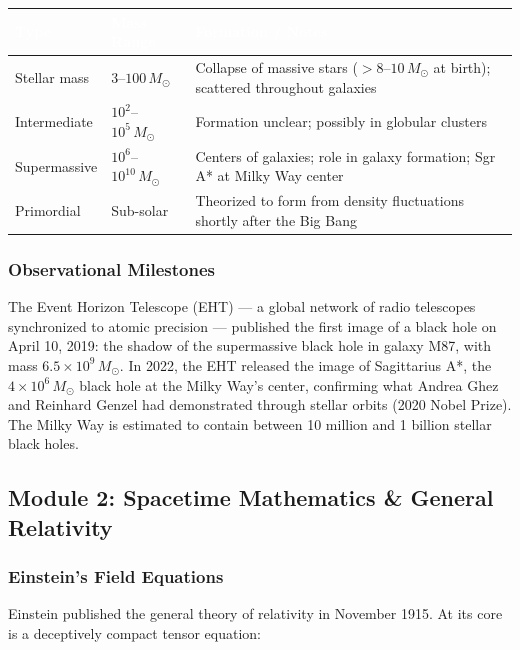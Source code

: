 \documentclass[11pt,letterpaper]{article}
\newcommand{\tableheader}[1]{\textbf{\sffamily\textcolor{white}{#1}}}
\begin{document}
\begin{center}
\begin{tabularx}{\textwidth}{L{3.5cm}L{3.5cm}X}
\toprule
{}
\tableheader{Type} & \tableheader{Mass Range} & \tableheader{Formation / Notes} \\
\midrule
Stellar mass & $3$--$100\, M_\odot$ & Collapse of massive stars ($>8$--$10\, M_\odot$ at birth); scattered throughout galaxies \\
Intermediate & $10^2$--$10^5\, M_\odot$ & Formation unclear; possibly in globular clusters \\
Supermassive & $10^6$--$10^{10}\, M_\odot$ & Centers of galaxies; role in galaxy formation; Sgr A* at Milky Way center \\
Primordial & Sub-solar & Theorized to form from density fluctuations shortly after the Big Bang \\
\bottomrule
\end{tabularx}
\end{center}

\subsubsection{Observational Milestones}

The Event Horizon Telescope (EHT) --- a global network of radio telescopes synchronized to atomic precision --- published the first image of a black hole on April 10, 2019: the shadow of the supermassive black hole in galaxy M87, with mass $6.5 \times 10^9\, M_\odot$. In 2022, the EHT released the image of Sagittarius A*, the $4 \times 10^6\, M_\odot$ black hole at the Milky Way's center, confirming what Andrea Ghez and Reinhard Genzel had demonstrated through stellar orbits (2020 Nobel Prize). The Milky Way is estimated to contain between 10 million and 1 billion stellar black holes.

\subsection{Module 2: Spacetime Mathematics \& General Relativity}

\subsubsection{Einstein's Field Equations}

Einstein published the general theory of relativity in November 1915. At its core is a deceptively compact tensor equation:
\end{document}
